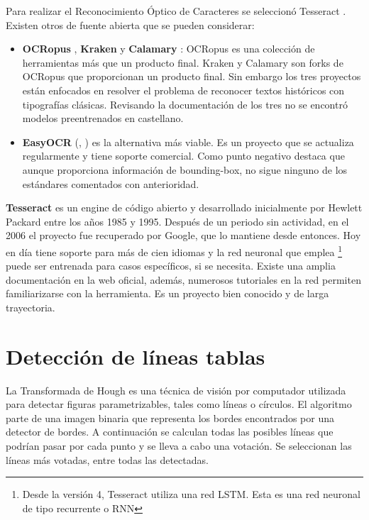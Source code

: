 Para realizar el Reconocimiento Óptico de Caracteres se seleccionó Tesseract \cite{ocr_tesseract_raysmithetal.TesseractocrTesseract2021}. Existen otros de fuente abierta que se pueden considerar:

\begin{itemize}
    \item \textbf{OCRopus} \cite{ocr_ocropus_ocropy_project}, \textbf{Kraken}  y \textbf{Calamary} \cite{ocr_calamari_journal}: OCRopus es una colección de herramientas más que un producto final. Kraken y Calamary son forks de OCRopus que proporcionan un producto final. Sin embargo los tres proyectos están enfocados en resolver el problema de reconocer textos históricos con tipografías clásicas. Revisando la documentación de los tres no se encontró modelos preentrenados en castellano.
    \item \textbf{EasyOCR} (\cite{ocr_easyocr_official}, \cite{ocr_easyocr_project}) es la alternativa más viable. Es un proyecto que se actualiza regularmente y tiene soporte comercial. Como punto negativo destaca que aunque proporciona información de bounding-box, no sigue ninguno de los estándares comentados con anterioridad.
\end{itemize}

\textbf{Tesseract} \cite{ocr_tesseract_smith_paper} es un engine de código abierto y desarrollado inicialmente por Hewlett Packard \cite{ocr_tesseract_v4_release_notes} entre los años 1985 y 1995. Después de un periodo sin actividad, en el 2006 el proyecto fue recuperado por Google, que lo mantiene desde entonces. Hoy en día tiene soporte para más de cien idiomas y la red neuronal que emplea \footnote{Desde la versión 4, Tesseract utiliza una red LSTM. Esta es una red neuronal de tipo recurrente o RNN} puede ser entrenada para casos específicos, si se necesita. Existe una amplia documentación en la web oficial, además, numerosos tutoriales en la red permiten familiarizarse con la herramienta. Es un proyecto bien conocido y de larga trayectoria.

\section{Detección de líneas tablas}


La Transformada de Hough es una técnica de visión por computador utilizada para detectar figuras parametrizables, tales como líneas o círculos. El algoritmo parte de una imagen binaria que representa los bordes encontrados por una detector de bordes. A continuación se calculan todas las posibles líneas que podrían pasar por cada punto y se lleva a cabo una votación. Se seleccionan las líneas más votadas, entre todas las detectadas.


